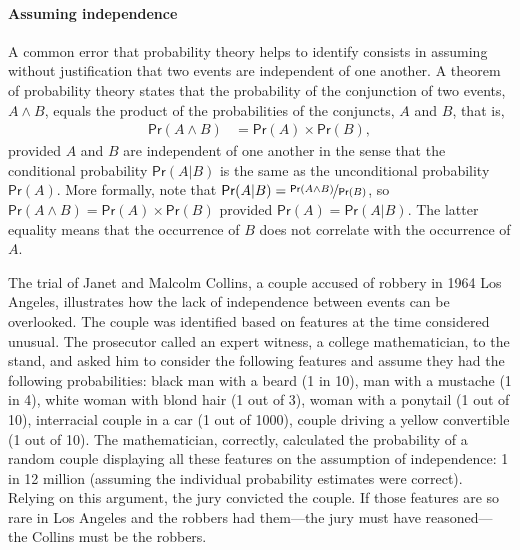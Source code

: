 \documentclass{article}
\newcommand{\pr}{\mathsf{Pr}}
\begin{document}
\paragraph{Assuming independence}

A common error that probability theory helps to identify consists in assuming without justification that two events are independent of one another.  
%
A theorem of probability theory states that the probability of the conjunction of two events, $A\wedge B$, equals the product of the probabilities of the conjuncts, $A$ and $B$, that is, 
%
\begin{align*}
\pr(A \wedge B) & = \pr(A)\times \pr(B),
\end{align*}
%
\noindent provided  $A$ and $B$ are independent of one another in the sense that the conditional probability $\pr(A | B)$ is the same as the unconditional probability $\pr(A)$. More formally, note that $\pr(A \vert B)=\nicefrac{\pr(A \wedge B)}{\pr(B)}$, so
$\pr(A \wedge B)=\pr(A)\times \pr(B)$
provided $\pr(A)=\pr(A \vert B)$. The latter equality means that the occurrence of $B$ does not correlate with the occurrence of $A$. 



The trial of Janet and Malcolm Collins, a couple accused of robbery in 1964 Los Angeles, illustrates how 
the lack of independence between events can be overlooked. The couple was identified based on features at the time considered unusual. The prosecutor called an expert witness, a college mathematician, to the stand, and asked him to consider the following features and assume they had the following  probabilities: black man with a beard (1 in 10), man with a mustache (1 in 4), white woman with blond hair (1 out of 3), woman with a ponytail (1 out of 10), interracial couple in a car (1 out of 1000), couple driving a yellow convertible (1 out of 10). The mathematician, correctly, calculated the probability of a random couple displaying all these features on the assumption of independence: 1 in 12 million (assuming the individual probability estimates were correct). Relying on this argument, the jury convicted the couple. If  those features are so rare in Los Angeles and the robbers had them---the jury must have reasoned---the Collins must be the robbers. 
%
\end{document}
